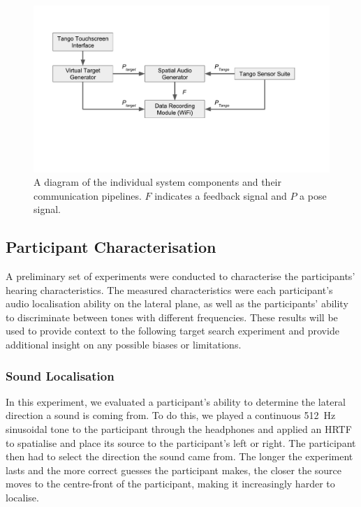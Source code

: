\documentclass[]{interact}
\begin{document}
\begin{figure}[t]
  \centering
  \includegraphics[clip=true, trim=0 120 80 50, width=\columnwidth]{figures/pipeline.pdf}
  \caption{A diagram of the individual system components and their communication pipelines. $F$ indicates a feedback signal and $P$ a pose signal.}\label{fig:pipeline}
\end{figure}

\subsection{Participant Characterisation}\label{sec:participant_characterisation}

A preliminary set of experiments were conducted to characterise the participants' hearing characteristics.
The measured characteristics were each participant's audio localisation ability on the lateral plane, as well as the participants' ability to discriminate between tones with different frequencies. 
These results will be used to provide context to the following target search experiment and provide additional insight on any possible biases or limitations. 

\subsubsection{Sound Localisation} \label{sec:sound_localisation}

In this experiment, we evaluated a participant's ability to determine the lateral direction a sound is coming from.
To do this, we played a continuous \SI{512}{\hertz} sinusoidal tone to the participant through the headphones and applied an HRTF to spatialise and place its source to the participant's left or right.
The participant then had to select the direction the sound came from.
The longer the experiment lasts and the more correct guesses the participant makes, the closer the source moves to the centre-front of the participant, making it increasingly harder to localise. 
\end{document}
